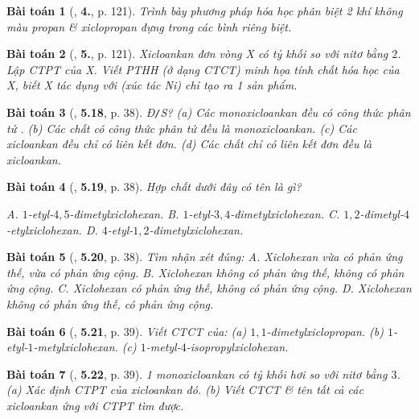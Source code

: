 \documentclass{article}
\numberwithin{equation}{section}
\newtheorem{baitoan}{Bài toán}[section]
\begin{document}
\begin{baitoan}[\cite{SGK_Hoa_Hoc_11_co_ban}, \textbf{4.}, p. 121]
	Trình bày phương pháp hóa học phân biệt 2 khí không màu propan \& xiclopropan đựng trong các bình riêng biệt.
\end{baitoan}

\begin{baitoan}[\cite{SGK_Hoa_Hoc_11_co_ban}, \textbf{5.}, p. 121]
	Xicloankan đơn vòng X có tỷ khối so với nitơ bằng $2$. Lập CTPT của X. Viết PTHH (ở dạng CTCT) minh họa tính chất hóa học của X, biết X tác dụng với \emph{} (xúc tác \emph{Ni}) chỉ tạo ra 1 sản phẩm.
\end{baitoan}

\begin{baitoan}[\cite{SBT_Hoa_Hoc_11_co_ban}, \textbf{5.18}, p. 38]
	\emph{Đ\texttt{/}S?} (a) Các monoxicloankan đều có công thức phân tử \emph{}. (b) Các chất có công thức phân tử \emph{} đều là monoxicloankan. (c) Các xicloankan đều chỉ có liên kết đơn. (d) Các chất chỉ có liên kết đơn đều là xicloankan.
\end{baitoan}

\begin{baitoan}[\cite{SBT_Hoa_Hoc_11_co_ban}, \textbf{5.19}, p. 38]
	Hợp chất dưới đây có tên là gì?
	\begin{center}
	\end{center}
	{\sf A.} $1$-etyl-$4,5$-đimetylxiclohexan. {\sf B.} $1$-etyl-$3,4$-đimetylxiclohexan. {\sf C.} $1,2$-đimetyl-$4$-etylxiclohexan. {\sf D.} $4$-etyl-$1,2$-đimetylxiclohexan.	
\end{baitoan}

\begin{baitoan}[\cite{SBT_Hoa_Hoc_11_co_ban}, \textbf{5.20}, p. 38]
	Tìm nhận xét đúng: {\sf A.} Xiclohexan vừa có phản ứng thế, vừa có phản ứng cộng. {\sf B.} Xiclohexan không có phản ứng thế, không có phản ứng cộng. {\sf C.} Xiclohexan có phản ứng thế, không có phản ứng cộng. {\sf D.} Xiclohexan không có phản ứng thế, có phản ứng cộng.
\end{baitoan}

\begin{baitoan}[\cite{SBT_Hoa_Hoc_11_co_ban}, \textbf{5.21}, p. 39]
	Viết CTCT của: (a) $1,1$-đimetylxiclopropan. (b) $1$-etyl-$1$-metylxiclohexan. (c) $1$-metyl-$4$-isopropylxiclohexan.
\end{baitoan}

\begin{baitoan}[\cite{SBT_Hoa_Hoc_11_co_ban}, \textbf{5.22}, p. 39]
	1 monoxicloankan có tỷ khối hơi so với nitơ bằng $3$. (a) Xác định CTPT của xicloankan đó. (b) Viết CTCT \& tên tất cả các xicloankan ứng với CTPT tìm được.
\end{baitoan}
\end{document}
